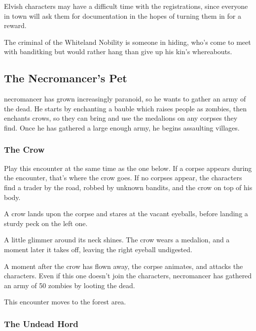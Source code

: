 Elvish characters may have a difficult time with the registrations, since everyone in town will ask them for documentation in the hopes of turning them in for a reward.

The criminal of the Whiteland Nobility is someone in hiding, who's come to meet with \gls{banditking} but would rather hang than give up his kin's whereabouts.

\subsection[The Necromancer's Pet]{The Necromancer's Pet}\label{necromancerspet}

\Gls{necromancer} has grown increasingly paranoid, so he wants to gather an army of the dead.  He starts by enchanting a bauble which raises people as zombies, then enchants crows, so they can bring and use the medalions on any corpses they find.  Once he has gathered a large enough army, he begins assaulting villages.

\subsubsection{The Crow}

Play this encounter at the same time as the one below.  If a corpse appears during the encounter, that's where the crow goes.  If no corpses appear, the characters find a trader by the road, robbed by unknown bandits, and the crow on top of his body.

\begin{boxtext}
	A crow lands upon the corpse and stares at the vacant eyeballs, before landing a sturdy peck on the left one.

	A little glimmer around its neck shines.  The crow wears a medalion, and a moment later it takes off, leaving the right eyeball undigested.

\end{boxtext}

A moment after the crow has flown away, the corpse animates, and attacks the characters.  Even if this one doesn't join the characters, \gls{necromancer} has gathered an army of 50 zombies by looting the dead.

\zombie

This encounter moves to the forest area.

\subsubsection{The Undead Hord}

